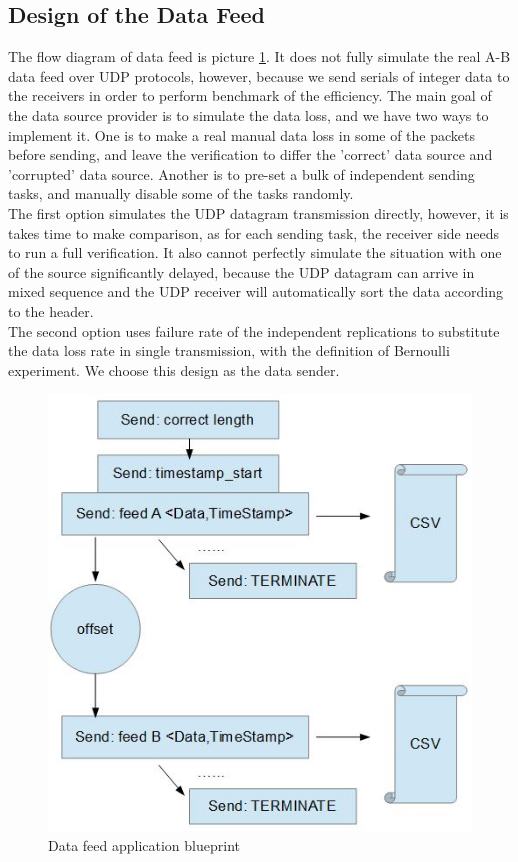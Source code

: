 \documentclass[11pt,openright,a4paper]{report}
\begin{document}
\subsection{Design of the Data Feed}
The flow diagram of data feed is picture \ref{fig:sender-diagram}. It does not fully simulate the real A-B data feed over UDP protocols, however, because we send serials of integer data to the receivers in order to perform benchmark of the efficiency. 
The main goal of the data source provider is to simulate the data loss, and we have two ways to implement it. One is to make a real manual data loss in some of the packets before sending, and leave the verification to differ the 'correct' data source and 'corrupted' data source. Another is to pre-set a bulk of independent sending tasks, and manually disable some of the tasks randomly.\\
The first option simulates the UDP datagram transmission directly, however, it is takes time to make comparison, as for each sending task, the receiver side needs to run a full verification. It also cannot perfectly simulate the situation with one of the source significantly delayed, because the UDP datagram can arrive in mixed sequence and the UDP receiver will automatically sort the data according to the header.\\
The second option uses failure rate of the independent replications to substitute the data loss rate in single transmission, with the definition of Bernoulli experiment\cite{anderberg2014cluster}. We choose this design as the data sender.\\
\begin{figure}[H]
	\centering
	\includegraphics[width=0.5\linewidth]{picture/sender-diagram}
	\caption{Data feed application blueprint}
	\label{fig:sender-diagram}
\end{figure}
\end{document}
